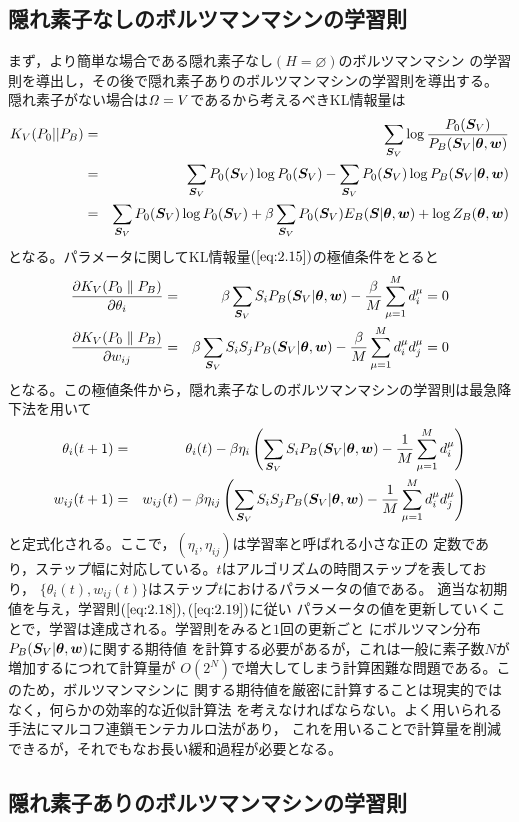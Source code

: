 \subsection{隠れ素子なしのボルツマンマシンの学習則}
まず，より簡単な場合である隠れ素子なし$(H=\varnothing)$のボルツマンマシン
の学習則を導出し，その後で隠れ素子ありのボルツマンマシンの学習則を導出する。
隠れ素子がない場合は$\mathit{\Omega}=V$であるから考えるべきKL情報量は
\begin{eqnarray}
K_{V}(P_{0}||P_{B})&=&\sum_{\bm{S}_{V}}\log\frac{P_{0}(\bm{S}_{V})}
{P_{B}(\bm{S}_{V}|\boldsymbol{\theta},\bm{w})}\nonumber\\
&=&\sum_{\bm{S}_{V}}P_{0}(\bm{S}_{V})\log P_{0}(\bm{S}_{V})-
\sum_{\bm{S}_{V}}P_{0}(\bm{S}_{V})\log
P_{B}(\bm{S}_{V}|\boldsymbol{\theta},\bm{w})\nonumber\\
&=&\sum_{\bm{S}_{V}}P_{0}(\bm{S}_{V})\log P_{0}(\bm{S}_{V})
+\beta\sum_{\bm{S}_{V}}P_{0}(\bm{S}_{V})E_{B}(\bm{S}|\boldsymbol{\theta},\bm{w})
+\log Z_{B}(\boldsymbol{\theta},\bm{w})\label{eq:2.15}
\end{eqnarray}
となる。パラメータに関してKL情報量$(\ref{eq:2.15})$の極値条件をとると
\begin{eqnarray}
\frac{\partial K_{V}(P_{0}\parallel P_{B})}{\partial\theta_{i}}
&=&\beta\sum_{\bm{S}_{V}}S_{i}P_{B}(\bm{S}_{V}|\boldsymbol{\theta},\bm{w})
-\frac{\beta}{M}\sum_{\mu=1}^{M}d_{i}^{\mu}=0\label{eq:2.16}\\
\frac{\partial K_{V}(P_{0}\parallel P_{B})}{\partial w_{ij}}
&=&\beta\sum_{\bm{S}_{V}}S_{i}S_{j}P_{B}(\bm{S}_{V}|\boldsymbol{\theta},\bm{w})
-\frac{\beta}{M}\sum_{\mu=1}^{M}d_{i}^{\mu}d_{j}^{\mu}=0
\label{eq:2.17}
\end{eqnarray}
となる。この極値条件から，隠れ素子なしのボルツマンマシンの学習則は最急降下法を用いて
\begin{eqnarray}
\theta_{i}(t+1)&=&\theta_{i}(t)-\beta\eta_{i}\left(
\sum_{\bm{S}_{V}}S_{i}P_{B}(\bm{S}_{V}|\boldsymbol{\theta},\bm{w})-\frac{1}{M}
\sum_{\mu=1}^{M}d_{i}^{\mu}\right)\label{eq:2.18}\\
w_{ij}(t+1)&=&w_{ij}(t)-\beta\eta_{ij}\left(
\sum_{\bm{S}_{V}}S_{i}S_{j}P_{B}(\bm{S}_{V}|\boldsymbol{\theta},\bm{w})
-\frac{1}{M}\sum_{\mu=1}^{M}d_{i}^{\mu}d_{j}^{\mu}\right)
\label{eq:2.19}
\end{eqnarray}
と定式化される。ここで，$(\eta_{i},\eta_{ij})$は学習率と呼ばれる小さな正の
定数であり，ステップ幅に対応している。$t$はアルゴリズムの時間ステップを表しており，
$\{\theta_{i}(t),w_{ij}(t)\}$はステップ$t$におけるパラメータの値である。
適当な初期値を与え，学習則$(\ref{eq:2.18}),(\ref{eq:2.19})$に従い
パラメータの値を更新していくことで，学習は達成される。学習則をみると$1$回の更新ごと
にボルツマン分布$P_{B}(\bm{S}_{V}|\boldsymbol{\theta},\bm{w})$に関する期待値
を計算する必要があるが，これは一般に素子数$N$が増加するにつれて計算量が
$O(2^{N})$で増大してしまう計算困難な問題である。このため，ボルツマンマシンに
関する期待値を厳密に計算することは現実的ではなく，何らかの効率的な近似計算法
を考えなければならない。よく用いられる手法にマルコフ連鎖モンテカルロ法があり，
これを用いることで計算量を削減できるが，それでもなお長い緩和過程が必要となる。
\subsection{隠れ素子ありのボルツマンマシンの学習則}
